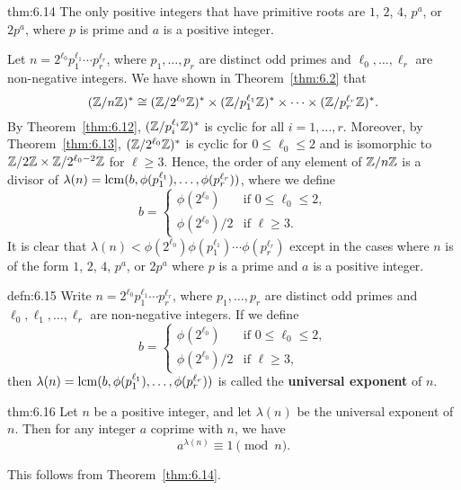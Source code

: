 \begin{theo}{thm:6.14}
    The only positive integers that have primitive roots are $1$, $2$, 
    $4$, $p^a$, or $2p^a$, where $p$ is prime and $a$ is a positive integer. 
\end{theo}
\begin{pf}
    Let $n = 2^{\ell_0} p_1^{\ell_1} \cdots p_r^{\ell_r}$, where $p_1, \dots, p_r$ 
    are distinct odd primes and $\ell_0, \dots, \ell_r$ are non-negative integers. 
    We have shown in Theorem~\ref{thm:6.2} that 
    \[ (\mathbb{Z}/n\mathbb{Z})^* \cong (\mathbb{Z}/2^{\ell_0}\mathbb{Z})^* \times (\mathbb{Z}/p_1^{\ell_1}\mathbb{Z})^* 
    \times \cdots \times (\mathbb{Z}/p_r^{\ell_r}\mathbb{Z})^*. \] 
    By Theorem~\ref{thm:6.12}, $(\mathbb{Z}/p_i^{\ell_i}\mathbb{Z})^*$ is cyclic for all 
    $i = 1, \dots, r$. Moreover, by Theorem~\ref{thm:6.13}, $(\mathbb{Z}/2^{\ell_0}\mathbb{Z})^*$ 
    is cyclic for $0 \leq \ell_0 \leq 2$ and is isomorphic to 
    $\mathbb{Z}/2\mathbb{Z} \times \mathbb{Z}/2^{\ell_0-2}\mathbb{Z}$ for $\ell \geq 3$. Hence, the order 
    of any element of $\mathbb{Z}/n\mathbb{Z}$ is a divisor of 
    $\lambda(n) = \operatorname{lcm}(b, \phi(p_1^{\ell_1}), \dots, \phi(p_r^{\ell_r}))$, 
    where we define 
    \[ b = \begin{cases} 
        \phi(2^{\ell_0}) & \text{if } 0 \leq \ell_0 \leq 2, \\ 
        \phi(2^{\ell_0})/2 & \text{if } \ell \geq 3.
    \end{cases} \] 
    It is clear that $\lambda(n) < \phi(2^{\ell_0}) \phi(p_1^{\ell_1}) 
    \cdots \phi(p_r^{\ell_r})$ except in the cases where $n$ is of the form 
    $1$, $2$, $4$, $p^a$, or $2p^a$ where $p$ is a prime and $a$ is a positive 
    integer. 
\end{pf}

\begin{defn}{defn:6.15}
    Write $n = 2^{\ell_0} p_1^{\ell_1} \cdots p_r^{\ell_r}$, where 
    $p_1, \dots, p_r$ are distinct odd primes and $\ell_0, \ell_1, \dots, 
    \ell_r$ are non-negative integers. If we define 
    \[ b = \begin{cases} 
        \phi(2^{\ell_0}) & \text{if } 0 \leq \ell_0 \leq 2, \\ 
        \phi(2^{\ell_0})/2 & \text{if } \ell \geq 3,
    \end{cases} \]
    then $\lambda(n) = \operatorname{lcm}(b, \phi(p_1^{\ell_1}), \dots, \phi(p_r^{\ell_r}))$ 
    is called the {\bf universal exponent} of $n$. 
\end{defn}

\begin{theo}{thm:6.16}
    Let $n$ be a positive integer, and let $\lambda(n)$ be the universal 
    exponent of $n$. Then for any integer $a$ coprime with $n$, we have 
    \[ a^{\lambda(n)} \equiv 1 \pmod n. \] 
\end{theo}
\begin{pf}
    This follows from Theorem~\ref{thm:6.14}. 
\end{pf}

